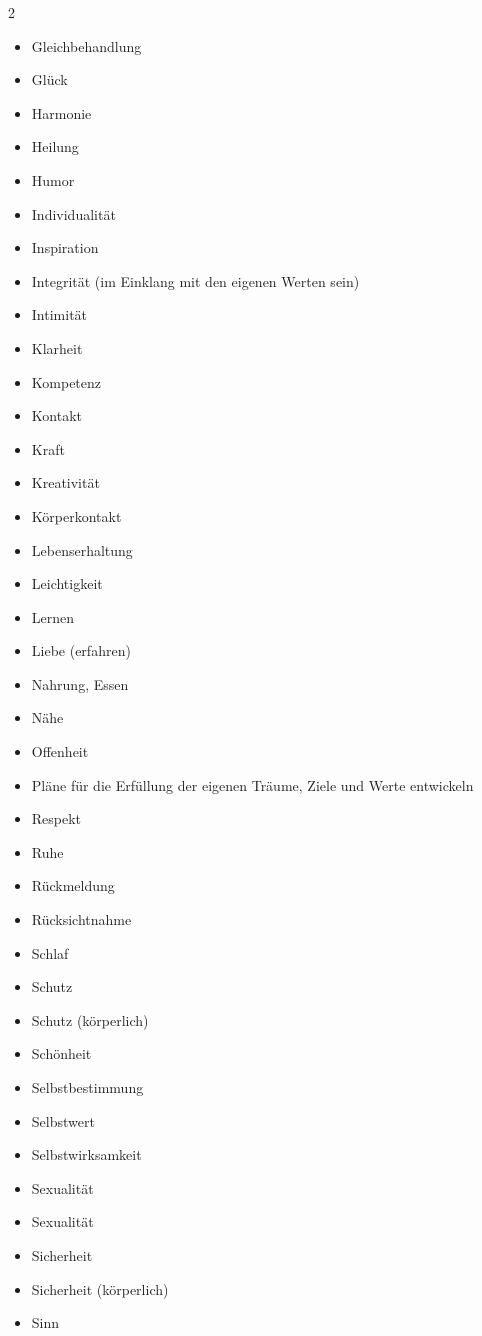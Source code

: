 \begin{multicols}{2}
\begin{itemize}
        \item Gleichbehandlung
        \item Glück
        \item Harmonie
        \item Heilung
        \item Humor
        \item Individualität
        \item Inspiration
        \item Integrität (im Einklang mit den eigenen Werten sein)
        \item Intimität
        \item Klarheit
        \item Kompetenz
        \item Kontakt
        \item Kraft
        \item Kreativität
        \item Körperkontakt
        \item Lebenserhaltung
        \item Leichtigkeit
        \item Lernen
        \item Liebe (erfahren)
        \item Nahrung, Essen
        \item Nähe
        \item Offenheit
        \item Pläne für die Erfüllung der eigenen Träume, Ziele und Werte entwickeln
        \item Respekt
        \item Ruhe
        \item Rückmeldung
        \item Rücksichtnahme
        \item Schlaf
        \item Schutz
        \item Schutz (körperlich)
        \item Schönheit
        \item Selbstbestimmung
        \item Selbstwert
        \item Selbstwirksamkeit
        \item Sexualität
        \item Sexualität
        \item Sicherheit
        \item Sicherheit (körperlich)
        \item Sinn

\end{itemize}
\end{multicols}
